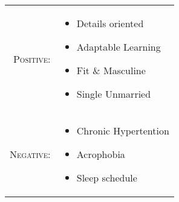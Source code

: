 %
%

\renewcommand{\arraystretch}{1.1}

\begin{tabular}{>{}r>{}p{13cm}}
    \textsc{Positive:} &
        \begin{itemize}
            \item Details oriented
            \item Adaptable Learning
            \item Fit \& Masculine
            \item Single Unmarried
        \end{itemize} \\

    \textsc{Negative:} &
        \begin{itemize}
            \item Chronic Hypertention
            \item Acrophobia
            \item Sleep schedule
        \end{itemize}
\end{tabular}

